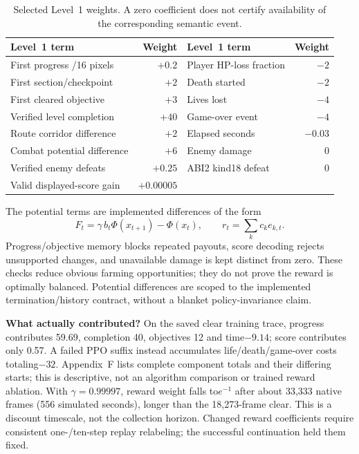 \documentclass[11pt,a4paper]{article}
\begin{document}
\begin{table}[ht]\centering\small
\begin{tabular}{@{}lr lr@{}}\toprule
Level~1 term & Weight & Level~1 term & Weight\\\midrule
First progress /16 pixels & $+0.2$ & Player HP-loss fraction & $-2$\\
First section/checkpoint & $+2$ & Death started & $-2$\\
First cleared objective & $+3$ & Lives lost & $-4$\\
Verified level completion & $+40$ & Game-over event & $-4$\\
Route corridor difference & $+2$ & Elapsed seconds & $-0.03$\\
Combat potential difference & $+6$ & Enemy damage & $0$\\
Verified enemy defeats & $+0.25$ & ABI2 kind18 defeat & $0$\\
Valid displayed-score gain & $+0.00005$ & &\\\bottomrule
\end{tabular}
\caption{Selected Level~1 weights. A zero coefficient does not certify availability of the corresponding semantic event.}\label{tab:rewards}
\end{table}

The potential terms are implemented differences of the form
\begin{equation}\label{eq:potential}
 F_t=\gamma\,b_t\Phi(x_{t+1})-\Phi(x_t),\qquad r_t=\sum_k c_k e_{k,t}.
\end{equation}
Progress/objective memory blocks repeated payouts, score decoding rejects unsupported changes, and unavailable damage is kept distinct from zero. These checks reduce obvious farming opportunities; they do not prove the reward is optimally balanced. Potential differences are scoped to the implemented termination/history contract, without a blanket policy-invariance claim.

\textbf{What actually contributed?} On the saved clear training trace, progress contributes 59.69, completion 40, objectives 12 and time$-9.14$; score contributes only 0.57. A failed PPO suffix instead accumulates life/death/game-over costs totaling$-32$. Appendix~F lists complete component totals and their differing starts; this is descriptive, not an algorithm comparison or trained reward ablation. With $\gamma=0.99997$, reward weight falls to$e^{-1}$ after about 33,333 native frames (556 simulated seconds), longer than the 18,273-frame clear. This is a discount timescale, not the collection horizon. Changed reward coefficients require consistent one-/ten-step replay relabeling; the successful continuation held them fixed.
\end{document}
